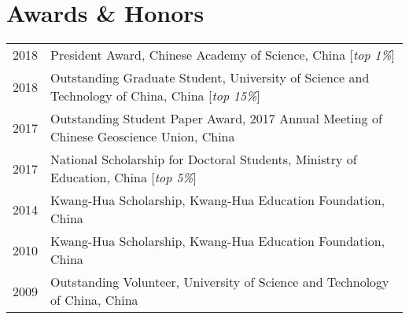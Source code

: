 \section*{Awards \& Honors}

\begin{tabular}{p{} p{}}
2018 & President Award, Chinese Academy of Science, China [\textit{top 1\%}] \\
2018 & Outstanding Graduate Student, University of Science and Technology of China, China [\textit{top 15\%}] \\
2017 & Outstanding Student Paper Award, 2017 Annual Meeting of Chinese Geoscience Union, China \\
2017 & National Scholarship for Doctoral Students, Ministry of Education, China [\textit{top 5\%}] \\
2014 & Kwang-Hua Scholarship, Kwang-Hua Education Foundation, China \\
2010 & Kwang-Hua Scholarship, Kwang-Hua Education Foundation, China \\
2009 & Outstanding Volunteer, University of Science and Technology of China, China \\
\end{tabular}
